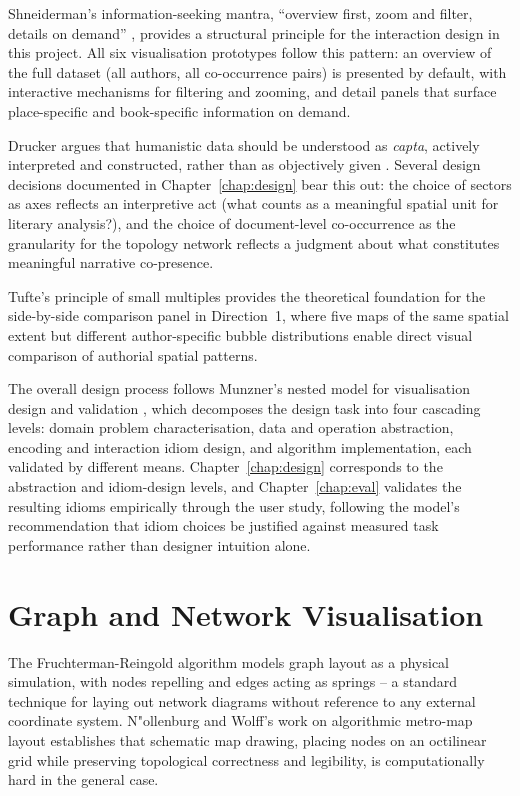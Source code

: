 \documentclass[logo,msc]{infthesis}
\begin{document}
Shneiderman's information-seeking mantra, ``overview first, zoom and filter, details on demand'' \cite{shneiderman1996}, provides a structural principle for the interaction design in this project. All six visualisation prototypes follow this pattern: an overview of the full dataset (all authors, all co-occurrence pairs) is presented by default, with interactive mechanisms for filtering and zooming, and detail panels that surface place-specific and book-specific information on demand.
 
Drucker argues that humanistic data should be understood as \emph{capta}, actively interpreted and constructed, rather than as objectively given \cite{drucker2011}. Several design decisions documented in Chapter~\ref{chap:design} bear this out: the choice of sectors as axes reflects an interpretive act (what counts as a meaningful spatial unit for literary analysis?), and the choice of document-level co-occurrence as the granularity for the topology network reflects a judgment about what constitutes meaningful narrative co-presence.
 
Tufte's principle of small multiples \cite{tufte1983} provides the theoretical foundation for the side-by-side comparison panel in Direction~1, where five maps of the same spatial extent but different author-specific bubble distributions enable direct visual comparison of authorial spatial patterns.

The overall design process follows Munzner's nested model for visualisation design and validation \cite{munzner2014}, which decomposes the design task into four cascading levels: domain problem characterisation, data and operation abstraction, encoding and interaction idiom design, and algorithm implementation, each validated by different means. Chapter~\ref{chap:design} corresponds to the abstraction and idiom-design levels, and Chapter~\ref{chap:eval} validates the resulting idioms empirically through the user study, following the model's recommendation that idiom choices be justified against measured task performance rather than designer intuition alone.
 
\section{Graph and Network Visualisation}

The Fruchterman-Reingold algorithm \cite{fruchterman1991} models graph layout as a physical simulation, with nodes repelling and edges acting as springs -- a standard technique for laying out network diagrams without reference to any external coordinate system. N{"o}llenburg and Wolff's work on algorithmic metro-map layout \cite{nollenburg2011} establishes that schematic map drawing, placing nodes on an octilinear grid while preserving topological correctness and legibility, is computationally hard in the general case.
 
\end{document}
